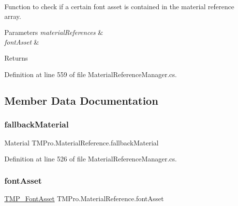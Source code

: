 Function to check if a certain font asset is contained in the material reference array. 


\begin{DoxyParams}{Parameters}
{\em material\+References} & \\
\hline
{\em font\+Asset} & \\
\hline
\end{DoxyParams}
\begin{DoxyReturn}{Returns}

\end{DoxyReturn}


Definition at line 559 of file Material\+Reference\+Manager.\+cs.



\subsection{Member Data Documentation}
\mbox{\label{struct_t_m_pro_1_1_material_reference_afb2e5da38674a7a363ad2b4f3c6215d7}} 
\subsubsection{\texorpdfstring{fallbackMaterial}{fallbackMaterial}}
{\footnotesize\ttfamily Material T\+M\+Pro.\+Material\+Reference.\+fallback\+Material}



Definition at line 526 of file Material\+Reference\+Manager.\+cs.

\mbox{\label{struct_t_m_pro_1_1_material_reference_a57d6038454b7627a678c178751ae7b2e}} 
\subsubsection{\texorpdfstring{fontAsset}{fontAsset}}
{\footnotesize\ttfamily \mbox{\hyperlink{class_t_m_pro_1_1_t_m_p___font_asset}{T\+M\+P\+\_\+\+Font\+Asset}} T\+M\+Pro.\+Material\+Reference.\+font\+Asset}



